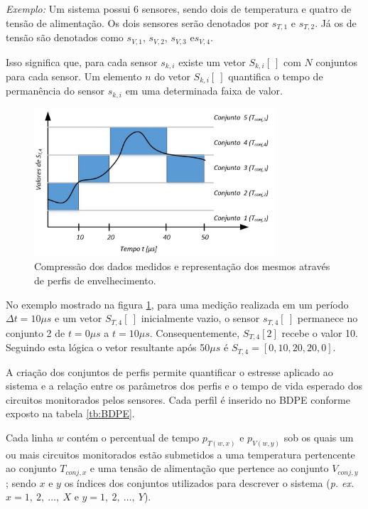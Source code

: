\textit{Exemplo:} Um sistema possui 6 sensores, sendo dois de temperatura e quatro de tensão de alimentação. Os dois sensores serão denotados por $s_{T,1}$ e $s_{T,2}$. Já os de tensão são denotados como $s_{V,1}$, $s_{V,2}$, $s_{V,3}$ e$s_{V,4}$.

Isso significa que, para cada sensor $s_{k,i}$ existe um vetor $S_{k,i}[\ ]$ com $N$ conjuntos para cada sensor. Um elemento $n$ do vetor $S_{k,i}[\ ]$ quantifica o tempo de permanência do sensor $s_{k,i}$ em uma determinada faixa de valor.
\begin{figure}
\center
\includegraphics[width=0.8\textwidth]{images/profile_sets}
\caption{Compressão dos dados medidos e representação dos mesmos através de perfis de envelhecimento.}
\label{figure:profile_sets}
\end{figure}

No exemplo mostrado na figura \ref{figure:profile_sets}, para uma medição realizada em um período $\Delta t=10 \mu s$ e um vetor $S_{T,4}[\ ]$ inicialmente vazio, o sensor $s_{T,4}[\ ]$ permanece no conjunto 2 de $t=0 \mu s$ a $t=10 \mu s$. Consequentemente, $S_{T,4}[2]$ recebe o valor 10. Seguindo esta lógica o vetor resultante após 50$\mu s$ é $S_{T,4} = [0,10,20,20,0]$.

A criação dos conjuntos de perfis permite quantificar o estresse aplicado ao sistema e a relação entre os parâmetros dos perfis e o tempo de vida esperado dos circuitos monitorados pelos sensores. Cada perfil é inserido no BDPE conforme exposto na tabela \ref{tb:BDPE}.

Cada linha $w$ contém o percentual de tempo $p_{T(w,x)}$ e $p_{V(w,y)}$ sob os quais um ou mais circuitos monitorados estão submetidos a uma temperatura pertencente ao conjunto $T_{conj,x}$ e uma tensão de alimentação que pertence ao conjunto $V_{conj,y}$ ; sendo $x$ e $y$ os índices dos conjuntos utilizados para descrever o sistema (\textit{p. ex.} $x = 1,\ 2, \ \dots,\ X$ e $y = 1,\ 2,\ \dots,\ Y$).

